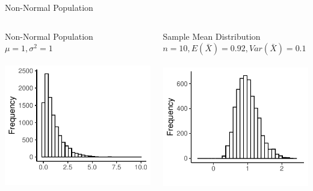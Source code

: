 \documentclass{./../div_teaching_slides}
\begin{document}
\begin{frame}{Non-Normal Population}
\centering
\begin{columns}
\begin{column}{0.475\textwidth}
\centering
Non-Normal Population \\ $\mu=1, \sigma^2 = 1$ \\~\\
\includegraphics{./../../output/clt_exp_pop.pdf}
\end{column}
\begin{column}{0.475\textwidth}
\centering
Sample Mean Distribution \\ $n=10, E(\bar{X})=0.92, Var(\bar{X}) = 0.1$ \\~\\
\includegraphics{./../../output/clt_exp_samp_n10.pdf}
\end{column}
\end{columns}
\end{frame}
\end{document}
